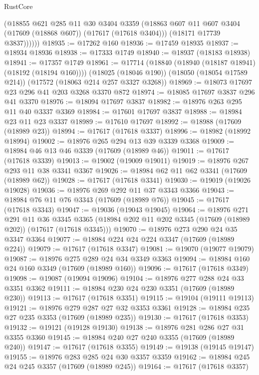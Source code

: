 \begin{lexlean}{RustCore}
\begin{coremodule}
            (@18855
              @621
              @285
              @11
              @30
              @3404
              @3359
              (@18863 @607 @11 @607 @3404 (@17609 (@18868 @607)) (@17617 (@17618 @3404)))
              (@18171 @17739 @3837))))))
@18935 := @17262 @160
@18936 := @17459 @18935
@18937 := @18934 @18936
@18938 := @17333 @1749
@18940 := @18937 (@18183 @18938)
@18941 := @17357 @1749
@18961 := @17714
    (@18840 (@18940 (@18187 @18941) (@18192 (@18194 @160))))
    (@18025 (@18046 @190))
    (@18050 (@18054 @17589 @214))
    (@17572 (@18063 @214 @257 @3327 @3268))
@18969 := @18073 @17697 @23 @296 @41 @203 @3268 @3370 @872
@18974 := @18085 @17697 @3837 @296 @41 @3370
@18976 := @18094 @17697 @3837
@18982 := @18976 @263 @295 @11 @40 @3337 @3369
@18984 := @17601 @17697 @3837
@18988 := @18984 @23 @11 @23 @3337
@18989 := @17610 @17697
@18992 := @18988 (@17609 (@18989 @23))
@18994 := @17617 (@17618 @3337)
@18996 := @18982 (@18992 @18994)
@19002 := @18976 @265 @294 @13 @39 @3339 @3368
@19009 := @18984 @46 @13 @46 @3339 (@17609 (@18989 @46))
@19011 := @17617 (@17618 @3339)
@19013 := @19002 (@19009 @19011)
@19019 := @18976 @267 @293 @11 @38 @3341 @3367
@19026 := @18984 @62 @11 @62 @3341 (@17609 (@18989 @62))
@19028 := @17617 (@17618 @3341)
@19030 := @19019 (@19026 @19028)
@19036 := @18976 @269 @292 @11 @37 @3343 @3366
@19043 := @18984 @76 @11 @76 @3343 (@17609 (@18989 @76))
@19045 := @17617 (@17618 @3343)
@19047 := @19036 (@19043 @19045)
@19064 := @18976
    @271
    @291
    @11
    @36
    @3345
    @3365
    (@18984 @202 @11 @202 @3345 (@17609 (@18989 @202)) (@17617 (@17618 @3345)))
@19070 := @18976 @273 @290 @24 @35 @3347 @3364
@19077 := @18984 @224 @24 @224 @3347 (@17609 (@18989 @224))
@19079 := @17617 (@17618 @3347)
@19081 := @19070 (@19077 @19079)
@19087 := @18976 @275 @289 @24 @34 @3349 @3363
@19094 := @18984 @160 @24 @160 @3349 (@17609 (@18989 @160))
@19096 := @17617 (@17618 @3349)
@19098 := @19087 (@19094 @19096)
@19104 := @18976 @277 @288 @24 @33 @3351 @3362
@19111 := @18984 @230 @24 @230 @3351 (@17609 (@18989 @230))
@19113 := @17617 (@17618 @3351)
@19115 := @19104 (@19111 @19113)
@19121 := @18976 @279 @287 @27 @32 @3353 @3361
@19128 := @18984 @235 @27 @235 @3353 (@17609 (@18989 @235))
@19130 := @17617 (@17618 @3353)
@19132 := @19121 (@19128 @19130)
@19138 := @18976 @281 @286 @27 @31 @3355 @3360
@19145 := @18984 @240 @27 @240 @3355 (@17609 (@18989 @240))
@19147 := @17617 (@17618 @3355)
@19149 := @19138 (@19145 @19147)
@19155 := @18976 @283 @285 @24 @30 @3357 @3359
@19162 := @18984 @245 @24 @245 @3357 (@17609 (@18989 @245))
@19164 := @17617 (@17618 @3357)

\end{coremodule}
\end{lexlean}
